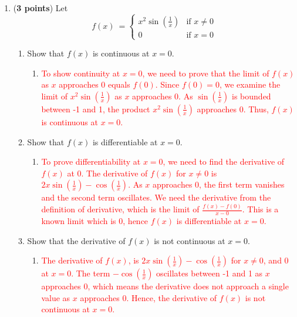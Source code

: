 \documentclass[11pt]{article}
\begin{document}
\begin{enumerate}
\begin{enumerate}
  \end{enumerate}

\item ({\bf 3 points}) Let
  $$
  f(x) \ = 
  \begin{cases}
    x^2 \sin \left (\displaystyle{\frac{1}{x}} \right ) 	& \text{if $x \ne 0$}\\
    0						& \text{if $x = 0$}
  \end{cases}
  $$
  \begin{enumerate}
  \item Show that $f(x)$ is continuous at $x = 0$.

    \begin{enumerate}
        \item[\textcolor{red}{}] \textcolor{red}{
            To show continuity at $x = 0$, we need to prove that the limit of $f(x)$ as $x$ approaches 0 equals $f(0)$. Since $f(0) = 0$, we examine the limit of $x^2 \sin\left(\frac{1}{x}\right)$ as $x$ approaches 0. As $\sin\left(\frac{1}{x}\right)$ is bounded between -1 and 1, the product $x^2 \sin\left(\frac{1}{x}\right)$ approaches 0. Thus, $f(x)$ is continuous at $x = 0$.
        }
    \end{enumerate}


  
  \item Show that $f(x)$ is differentiable at $x = 0$.

    \begin{enumerate}
        \item[\textcolor{red}{}] \textcolor{red}{
            To prove differentiability at $x = 0$, we need to find the derivative of $f(x)$ at 0. The derivative of $f(x)$ for $x \neq 0$ is $2x\sin\left(\frac{1}{x}\right) - \cos\left(\frac{1}{x}\right)$. As $x$ approaches 0, the first term vanishes and the second term oscillates. We need the derivative from the definition of derivative, which is the limit of $\frac{f(x) - f(0)}{x - 0}$. This is a known limit which is 0, hence $f(x)$ is differentiable at $x = 0$.
        }
    \end{enumerate}
    
  
  \item Show that the derivative of $f(x)$ is not continuous at $x = 0$.  

    \begin{enumerate}
        \item[\textcolor{red}{}] \textcolor{red}{
            The derivative of $f(x)$, is $2x\sin\left(\frac{1}{x}\right) - \cos\left(\frac{1}{x}\right)$ for $x \neq 0$, and 0 at $x = 0$. The term $-\cos\left(\frac{1}{x}\right)$ oscillates between -1 and 1 as $x$ approaches 0, which means the derivative does not approach a single value as $x$ approaches 0. Hence, the derivative of $f(x)$ is not continuous at $x = 0$.
        }
    \end{enumerate}
  

\end{enumerate}
\end{enumerate}
\end{document}
